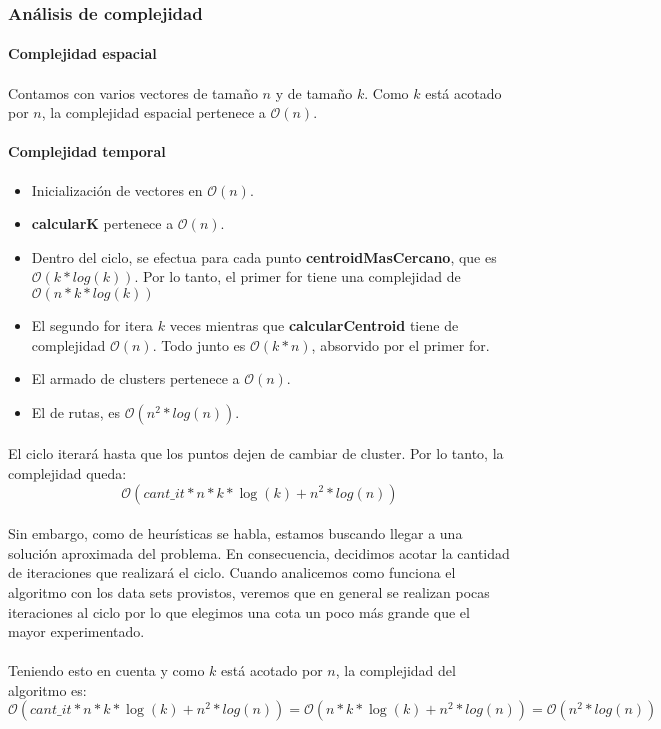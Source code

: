 \subsubsection{Análisis de complejidad}
\paragraph{Complejidad espacial}
\paragraph{}Contamos con varios vectores de tamaño $n$ y de tamaño $k$. Como $k$ está acotado por $n$, la complejidad espacial pertenece a $\mathcal{O}(n)$.
\paragraph{Complejidad temporal}
\begin{itemize}
	\item Inicialización de vectores en $\mathcal{O}(n)$.
	\item \textbf{calcularK} pertenece a $\mathcal{O}(n)$.
	\item Dentro del ciclo, se efectua para cada punto \textbf{centroidMasCercano}, que es $\mathcal{O}(k*log(k))$. Por lo tanto, el primer for tiene una complejidad de $\mathcal{O}(n*k*log(k))$
	\item El segundo for itera $k$ veces mientras que \textbf{calcularCentroid} tiene de complejidad $\mathcal{O}(n)$. Todo junto es $\mathcal{O}(k*n)$, absorvido por el primer for.
	\item El armado de clusters pertenece a $\mathcal{O}(n)$.
	\item El de rutas, es $\mathcal{O}(n^2*log(n))$.
\end{itemize}
\paragraph{}El ciclo iterará hasta que los puntos dejen de cambiar de cluster. Por lo tanto, la complejidad queda:
$$\mathcal{O}(cant\_it *n*k*\log(k)+n^2*log(n))$$
\paragraph{}
Sin embargo, como de heurísticas se habla, estamos buscando llegar a una solución aproximada del problema. En consecuencia, decidimos acotar la cantidad de iteraciones que realizará el ciclo. Cuando analicemos como funciona el algoritmo con los data sets provistos, veremos que en general se realizan pocas iteraciones al ciclo por lo que elegimos una cota un poco más grande que el mayor experimentado. 
\paragraph{}
Teniendo esto en cuenta y como $k$ está acotado por $n$, la complejidad del algoritmo es:
$$\mathcal{O}(cant\_it *n*k*\log(k)+n^2*log(n)) = \mathcal{O}(n*k*\log(k)+n^2*log(n))= \mathcal{O}(n^2*log(n))$$